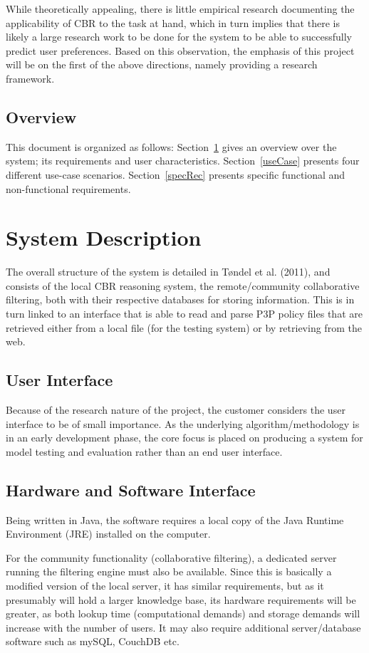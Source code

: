 While theoretically appealing, there is little empirical research documenting the applicability of CBR to the task at hand, which in turn implies that there is likely a large research work to be done for the system to be able to successfully predict user preferences. Based on this observation, the emphasis of this project will be on the first of the above directions, namely providing a research framework.

\subsection{Overview}
This document is organized as follows:
Section~\ref{sysDesc} gives an overview over the system; its requirements and user characteristics.
Section~\ref{useCase} presents four different use-case scenarios.
Section~\ref{specRec} presents specific functional and non-functional requirements.


\section{System Description}\label{sysDesc}
The overall structure of the system is detailed in T{\o}ndel et al. (2011), and consists of the local CBR reasoning system, the remote/community collaborative filtering, both with their respective databases for storing information. This is in turn linked to an interface that is able to read and parse P3P policy files that are retrieved either from a local file (for the testing system) or by retrieving from the web.

\subsection{User Interface}
Because of the research nature of the project, the customer considers the user interface to be of small importance. As the underlying algorithm/methodology is in an early development phase, the core focus is placed on producing a system for model testing and evaluation rather than an end user interface. 

\subsection{Hardware and Software Interface}
Being written in Java, the software requires a local copy of the Java Runtime Environment (JRE) installed on the computer. 

For the community functionality (collaborative filtering), a dedicated server running the filtering engine must also be available. Since this is basically a modified version of the local server, it has similar requirements, but as it presumably will hold a larger knowledge base, its hardware requirements will be greater, as both lookup time (computational demands) and storage demands will increase with the number of users. It may also require additional server/database software such as mySQL, CouchDB etc. 

